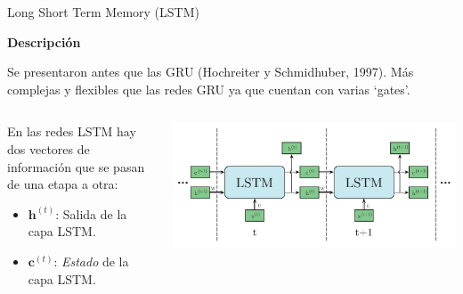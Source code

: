 \documentclass[aspectratio=169]{beamer}
\newenvironment{blockm}[1]{%
  \begin{block}{\textbf{#1}}%
  }{%
  \end{block}%
  \vspace{1em}%
}
\begin{document}
\begin{frame}{Long Short Term Memory (LSTM)}

	\begin{blockm}{Descripción}
		Se presentaron antes que las GRU (Hochreiter y Schmidhuber, 1997). Más complejas y flexibles que las redes GRU ya que cuentan con varias `gates'.
	\end{blockm}
	
	\begin{columns}
		\begin{column}{0.4\textwidth}
			En las redes LSTM hay dos vectores de información que se pasan de una etapa a otra:

			\begin{itemize}
				\item $ \mathbf{h}^{(t)} $: Salida de la capa LSTM.
				\item $ \mathbf{c}^{(t)} $: \textit{Estado} de la capa LSTM.
			\end{itemize}
		\end{column}

		\begin{column}{0.6\textwidth}
			\includegraphics[width=\textwidth, center]{imgs/tema4/rnn/LSTMsec.pdf}
		\end{column}
	\end{columns}
\end{frame}
\end{document}
